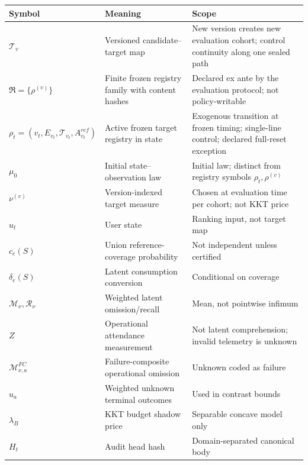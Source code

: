 \documentclass[
  11pt]{article}
\begin{document}
\begin{longtable}[]{@{}
  >{\raggedright\arraybackslash}p{}
  >{\raggedright\arraybackslash}p{}
  >{\raggedright\arraybackslash}p{}@{}}
\toprule\noalign{}
\begin{minipage}[b]{\linewidth}\raggedright
Symbol
\end{minipage} & \begin{minipage}[b]{\linewidth}\raggedright
Meaning
\end{minipage} & \begin{minipage}[b]{\linewidth}\raggedright
Scope
\end{minipage} \\
\midrule\noalign{}
\endhead
\bottomrule\noalign{}
\endlastfoot
\(\mathcal T_v\) & Versioned candidate--target map & New version creates
new evaluation cohort; control continuity along one sealed path \\
\(\mathfrak R=\{\rho^{(v)}\}\) & Finite frozen registry family with
content hashes & Declared ex ante by the evaluation protocol; not
policy-writable \\
\(\rho_t=(v_t,E_{v_t},\mathcal T_{v_t},A^{ref}_{v_t})\) & Active frozen
target registry in state & Exogenous transition at frozen timing;
single-line control; declared full-reset exception \\
\(\mu_0\) & Initial state--observation law & Initial law; distinct from
registry symbols \(\rho_t,\rho^{(v)}\) \\
\(\nu^{(v)}\) & Version-indexed target measure & Chosen at evaluation
time per cohort; not KKT price \\
\(u_t\) & User state & Ranking input, not target map \\
\(c_e(S)\) & Union reference-coverage probability & Not independent
unless certified \\
\(\delta_e(S)\) & Latent consumption conversion & Conditional on
coverage \\
\(\mathcal M_\nu,\mathcal R_\nu\) & Weighted latent omission/recall &
Mean, not pointwise infimum \\
\(Z\) & Operational attendance measurement & Not latent comprehension;
invalid telemetry is unknown \\
\(\mathcal M^{FC}_{\nu,a}\) & Failure-composite operational omission &
Unknown coded as failure \\
\(u_a\) & Weighted unknown terminal outcomes & Used in contrast
bounds \\
\(\lambda_B\) & KKT budget shadow price & Separable concave model
only \\
\(H_t\) & Audit head hash & Domain-separated canonical body \\
\end{longtable}
\end{document}
